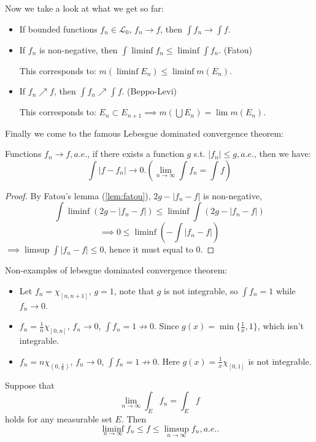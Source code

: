 Now we take a look at what we get so far:
\begin{itemize}
	\item If bounded functions $f_n\in \mathcal{L}_0$, $f_n\to f$,
		then $\int f_n\to \int f$.
	\item If $f_n$ is non-negative, then $\int \liminf f_n \le \liminf \int f_n$. (Fatou)

		This corresponds to: $m(\liminf E_n)\le \liminf m(E_n)$.
	\item If $f_n \nearrow f$, then $\int f_n \nearrow \int f$. (Beppo-Levi)

		This corresponds to: $E_n \subset E_{n+1} \implies m(\bigcup E_n) = \lim m(E_n)$.
\end{itemize}

Finally we come to the famous Lebesgue dominated convergence theorem:
\begin{theorem}
	\label{thm:dominated}
    Functions $f_n \to f, a.e.$, if there exists a function  $g$ s.t.
	$|f_n|\le g, a.e.$, then we have:
	 \[
	\int |f-f_n| \to 0. \left(\lim_{n\to \infty} \int f_n = \int f\right)
    \]
\end{theorem}
\begin{proof}[Proof]
    By Fatou's lemma (\ref{lem:fatou}), $2g - |f_n-f|$ is non-negative,
	 \[
	\int \liminf (2g-|f_n-f|) \le \liminf \int (2g - |f_n-f|)
	\]
	\[
	\implies 0 \le \liminf \left(- \int |f_n - f|\right)
	\]
	$\implies \limsup \int |f_n - f| \le 0$, hence it must equal to $0$.
\end{proof}
\begin{example}
    Non-examples of lebesgue dominated convergence theorem:
	\begin{itemize}
		\item Let $f_n = \chi_{[n, n+1]}$, $g = 1$, note that $g$ is not
			integrable, so $\int f_n = 1$ while  $f_n \to 0$.
		\item $f_n = \frac{1}{n}\chi_{[0,n]}$, $f_n\to 0$,  $\int f_n =1\not\to 0$.
			Since  $g(x)= \min\{\frac{1}{x}, 1\}$, which isn't integrable.
		\item $f_n = n\chi_{(0, \frac{1}{n})}$, $f_n \to 0$,  $\int f_n =1\not\to 0$.
			Here  $g(x) = \frac{1}{x}\chi_{[0,1]}$ is not integrable.
	\end{itemize}
\end{example}
\begin{example}
    Suppose that
	\[
	\lim_{n\to \infty}\int_E f_n = \int_E f
	\]
	holds for any measurable set $E$. Then
	\[
	\liminf_{n\to \infty} f_n \le f\le \limsup_{n\to \infty} f_n, a.e..
	\]
\end{example}
